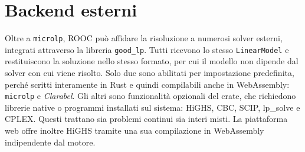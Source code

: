 \section{Backend esterni}
\label{sec:backend-esterni}

Oltre a \texttt{microlp}, ROOC può affidare la risoluzione a numerosi solver
esterni, integrati attraverso la libreria \texttt{good\_lp}. Tutti ricevono lo
stesso \texttt{LinearModel} e restituiscono la soluzione nello stesso formato,
per cui il modello non dipende dal solver con cui viene risolto. Solo due sono
abilitati per impostazione predefinita, perché scritti interamente in Rust e
quindi compilabili anche in WebAssembly: \texttt{microlp} e \emph{Clarabel}.
Gli altri sono funzionalità opzionali del crate, che richiedono librerie native o programmi
installati sul sistema: HiGHS, CBC, SCIP, lp\_solve e CPLEX. 
Questi trattano sia problemi continui sia interi misti. La piattaforma web offre inoltre HiGHS
tramite una sua compilazione in WebAssembly indipendente dal motore.
